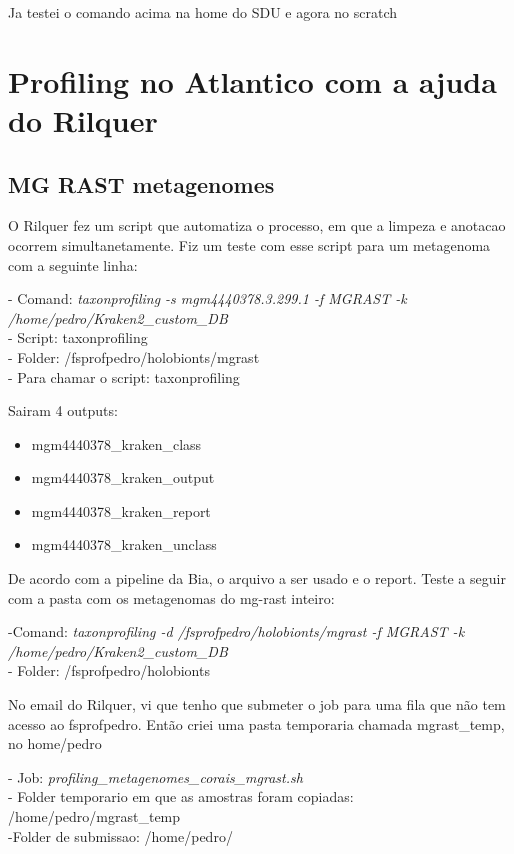 \documentclass[12pt, a4paper]{report}
\begin{document}
Ja testei o comando acima na home do SDU e agora no scratch

\newpage
\section{Profiling no Atlantico com a ajuda do Rilquer}
\subsection{MG RAST metagenomes}
O Rilquer fez um script que automatiza o processo, em que a limpeza e anotacao ocorrem simultanetamente. Fiz um teste com esse script para um metagenoma com a seguinte linha:

\begin{tcolorbox}[width=6.3in]
- Comand: \textit{taxonprofiling -s mgm4440378.3.299.1 -f MGRAST -k /home/pedro/Kraken2\_custom\_DB}\\
- Script: taxonprofiling\\
- Folder: /fsprofpedro/holobionts/mgrast\\
- Para chamar o script: taxonprofiling
\end{tcolorbox}

Sairam 4 outputs:
\begin{itemize}
\item mgm4440378\_kraken\_class
\item mgm4440378\_kraken\_output
\item mgm4440378\_kraken\_report
\item mgm4440378\_kraken\_unclass
\end{itemize}

De acordo com a pipeline da Bia, o arquivo a ser usado e o report. Teste a seguir com a pasta com os metagenomas do mg-rast inteiro:

\begin{tcolorbox}[width=6.3in]
-Comand: \textit{taxonprofiling -d /fsprofpedro/holobionts/mgrast -f MGRAST -k /home/pedro/Kraken2\_custom\_DB}\\
- Folder: /fsprofpedro/holobionts
\end{tcolorbox}

No email do Rilquer, vi que tenho que submeter o job para uma fila que não tem acesso ao fsprofpedro. Então criei uma pasta temporaria chamada mgrast\_temp, no home/pedro

\begin{tcolorbox}
- Job: \textit{profiling\_metagenomes\_corais\_mgrast.sh}\\
- Folder temporario em que as amostras foram copiadas: /home/pedro/mgrast\_temp \\
-Folder de submissao:  /home/pedro/
\end{tcolorbox}
\end{document}
